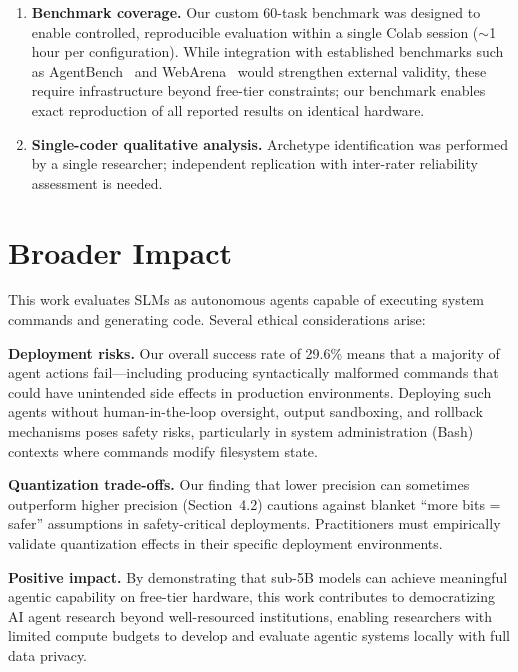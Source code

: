 \documentclass{article}
\begin{document}
\begin{enumerate}[nosep,leftmargin=*]
  \item \textbf{Benchmark coverage.} Our custom 60-task benchmark was designed to enable controlled, reproducible evaluation within a single Colab session ($\sim$1 hour per configuration). While integration with established benchmarks such as AgentBench~\cite{liu2023agentbench} and WebArena~\cite{zhou2024webarena} would strengthen external validity, these require infrastructure beyond free-tier constraints; our benchmark enables exact reproduction of all reported results on identical hardware.
  \item \textbf{Single-coder qualitative analysis.} Archetype identification was performed by a single researcher; independent replication with inter-rater reliability assessment is needed.
\end{enumerate}

\section{Broader Impact}

This work evaluates SLMs as autonomous agents capable of executing system commands and generating code. Several ethical considerations arise:

\textbf{Deployment risks.} Our overall success rate of 29.6\% means that a majority of agent actions fail---including producing syntactically malformed commands that could have unintended side effects in production environments. Deploying such agents without human-in-the-loop oversight, output sandboxing, and rollback mechanisms poses safety risks, particularly in system administration (Bash) contexts where commands modify filesystem state.

\textbf{Quantization trade-offs.} Our finding that lower precision can sometimes outperform higher precision (Section~4.2) cautions against blanket ``more bits = safer'' assumptions in safety-critical deployments. Practitioners must empirically validate quantization effects in their specific deployment environments.

\textbf{Positive impact.} By demonstrating that sub-5B models can achieve meaningful agentic capability on free-tier hardware, this work contributes to democratizing AI agent research beyond well-resourced institutions, enabling researchers with limited compute budgets to develop and evaluate agentic systems locally with full data privacy.
\end{document}
